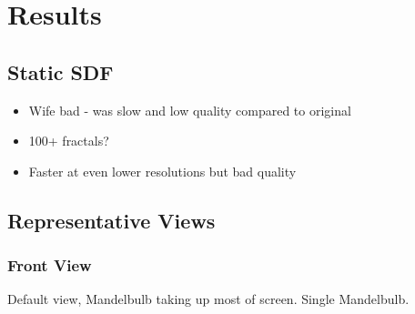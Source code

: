 \chapter{Results}
\label{chapter4}

\section{Static SDF}

\begin{itemize}
	\item Wife bad - was slow and low quality compared to original
	\item 100+ fractals?
	\item Faster at even lower resolutions but bad quality
\end{itemize}

\section{Representative Views}

\subsection{Front View}

Default view, Mandelbulb taking up most of screen. Single Mandelbulb.


